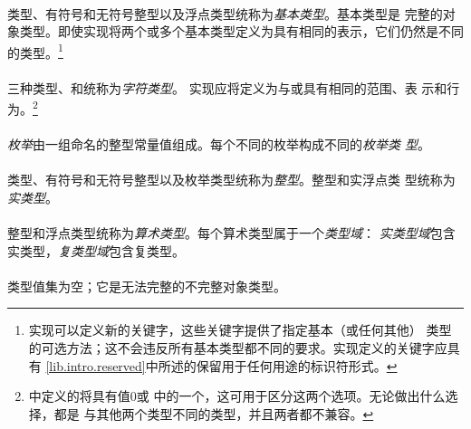 {\paragraph{}
类型、有符号和无符号整型以及浮点类型统称为\textit{基本类型}。基本类型是
完整的对象类型。即使实现将两个或多个基本类型定义为具有相同的表示，它们仍然是不同
的类型。\footnote{ 实现可以定义新的关键字，这些关键字提供了指定基本（或任何其他）
类型的可选方法；这不会违反所有基本类型都不同的要求。实现定义的关键字应具有
\ref{lib.intro.reserved}中所述的保留用于任何用途的标识符形式。}

\paragraph{}
三种类型、和统称为\textit{字符类型}。
实现应将定义为与或具有相同的范围、表
示和行为。\footnote{中定义的将具有值$0$或
中的一个，这可用于区分这两个选项。无论做出什么选择，都是
与其他两个类型不同的类型，并且两者都不兼容。}

\paragraph{}
\textit{枚举}由一组命名的整型常量值组成。每个不同的枚举构成不同的\textit{枚举类
型}。

\paragraph{}
类型、有符号和无符号整型以及枚举类型统称为\textit{整型}。整型和实浮点类
型统称为\textit{实类型}。

\paragraph{}
整型和浮点类型统称为\textit{算术类型}。每个算术类型属于一个\textit{类型域}：
\textit{实类型域}包含实类型，\textit{复类型域}包含复类型。

\paragraph{}
类型值集为空；它是无法完整的不完整对象类型。

}
